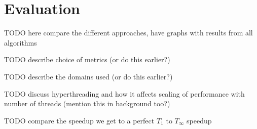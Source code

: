 \chapter{Evaluation}

TODO here compare the different approaches, have graphs with results from all algorithms

TODO describe choice of metrics (or do this earlier?)

TODO describe the domains used (or do this earlier?)

TODO discuss hyperthreading and how it affects scaling of performance with number of threads (mention this in background too?)

TODO compare the speedup we get to a perfect $T_1$ to $T_\infty$ speedup